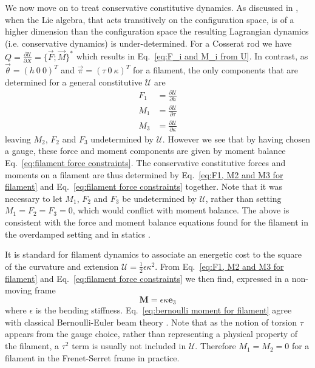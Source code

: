 We now move on to treat conservative constitutive dynamics. As discussed in \citep{levyReviewElieCartan1935}, when the Lie algebra, that acts transitively on the configuration space, is of a higher dimension than the configuration space the resulting Lagrangian dynamics (i.e. conservative dynamics) is under-determined. For a Cosserat rod we have $Q = \frac{\partial \mathcal{U}}{\partial X} = \{ \vec{F} ; \vec{M} \}^*$ which results in Eq.~\ref{eq:F_i and M_i from U}. In contrast, as $\vec{\theta} = (h\ 0\ 0)^T$ and $\vec{\pi} = (\tau\ 0\ \kappa)^T$ for a filament, the only components that are determined for a general constitutive $\mathcal{U}$ are
\begin{subequations} \label{eq:F1, M2 and M3 for filament}
\begin{align}
F_1 & =  \frac{\partial \mathcal{U}}{\partial h} \\
M_1 & =  \frac{\partial \mathcal{U}}{\partial \tau} \\
M_3 & =  \frac{\partial \mathcal{U}}{\partial \kappa} 
\end{align}
\end{subequations}
leaving $M_2$, $F_2$ and $F_3$ undetermined by $\mathcal{U}$. However we see that by having chosen a gauge, these force and moment components are given by moment balance Eq.~\ref{eq:filament force constraints}. The conservative constitutive forces and moments on a filament are thus determined by Eq.~\ref{eq:F1, M2 and M3 for filament} and Eq.~\ref{eq:filament force constraints} together. Note that it was necessary to let $M_1$, $F_2$ and $F_3$ be undetermined by $\mathcal{U}$, rather than setting $M_1 = F_2 = F_3 = 0$, which would conflict with moment balance. The above is consistent with the force and moment balance equations found for the filament in the overdamped setting \citep{powersDynamicsFilamentsMembranes2010} and in statics \citep{parkerDerivationNonlinearRod1984a}.

It is standard for filament dynamics to associate an energetic cost to the square of the curvature and extension $\mathcal{U} = \frac{1}{2} \epsilon \kappa^2$.  From Eq.~\ref{eq:F1, M2 and M3 for filament} and Eq.~\ref{eq:filament force constraints} we then find, expressed in a non-moving frame
\begin{equation} \label{eq:bernoulli moment for filament}
\mathbf{M} = \epsilon \kappa \mathbf{e}_3
\end{equation}
where $\epsilon$ is the bending stiffness. Eq.~\ref{eq:bernoulli moment for filament} agree with classical Bernoulli-Euler beam theory \citep{ powersDynamicsFilamentsMembranes2010, sodaDynamicsStiffChains1973, nordgrenComputationMotionElastic1974}. Note that as the notion of torsion $\tau$ appears from the gauge choice, rather than representing a physical property of the filament, a $\tau^2$ term is usually not included in $\mathcal{U}$. Therefore $M_1 = M_2 = 0$ for a filament in the Frenet-Serret frame in practice.

